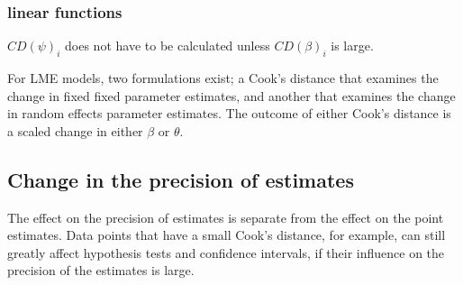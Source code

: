 \documentclass[12pt, a4paper]{article}
\begin{document}
\subsubsection{linear functions}

$CD(\psi)_i$ does not have to be calculated unless $CD(\beta)_i$ is large.

%

For LME models, two formulations exist; a Cook's distance that examines the change in fixed fixed parameter estimates, and another that examines the change in random effects parameter estimates. The outcome of either Cook's distance is a scaled change in either $\beta$ or $\theta$.


%
%
%
%
%
%




\subsection{Change in the precision of estimates}

The effect on the precision of estimates is separate from the effect on the point estimates. Data points that
have a small  Cook's distance, for example, can still greatly affect hypothesis tests and confidence intervals, if their  influence on the precision of the estimates is large.
\end{document}
